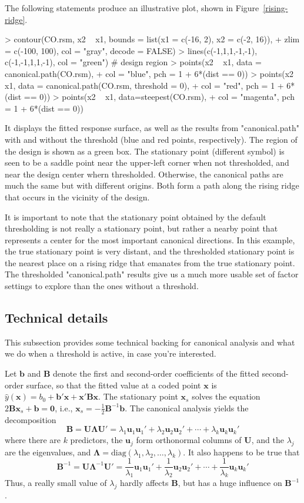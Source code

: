\documentclass[article,nojss]{jss}
\def\bb{\mathbf{b}}
\def\bB{\mathbf{B}}
\def\bu{\mathbf{u}}
\def\bU{\mathbf{U}}
\def\bLambda{\pmb{\Lambda}}
\def\bx{\mathbf{x}}
\def\bzero{\mathbf{0}}
\def\yhat{\hat{y}}
\begin{document}
The following statements produce an illustrative plot, shown in Figure~\ref{rising-ridge}.
\begin{Schunk}
\begin{Sinput}
> contour(CO.rsm, x2 ~ x1, bounds = list(x1 = c(-16, 2), x2 = c(-2, 16)), 
+         zlim = c(-100, 100), col = "gray", decode = FALSE)
> lines(c(-1,1,1,-1,-1), c(-1,-1,1,1,-1), col = "green") # design region
> points(x2 ~ x1, data = canonical.path(CO.rsm), 
+         col = "blue", pch = 1 + 6*(dist == 0))
> points(x2 ~ x1, data = canonical.path(CO.rsm, threshold = 0), 
+         col = "red", pch = 1 + 6*(dist == 0))
> points(x2 ~ x1, data=steepest(CO.rsm), 
+         col = "magenta", pch = 1 + 6*(dist == 0))
\end{Sinput}
\end{Schunk}
It displays the fitted response surface, as well as the results from "canonical.path" with and without the threshold (blue and red points, respectively). The region of the design is shown as a green box. The stationary point (different symbol) is seen to be a saddle point near the upper-left corner when not thresholded, and near the design center whern thresholded. Otherwise, the canonical paths are much the same but with different origins. Both form a path along the rising ridge that occurs in the vicinity of the design. 

It is important to note that the stationary point obtained by the default thresholding is not really a stationary point, but rather a nearby point that represents a center for the most important canonical directions. In this example, the true stationary point is very distant, and the thresholded stationary point is the nearest place on a rising ridge that emanates from the true stationary point. The thresholded "canonical.path" results give us a much more usable set of factor settings to explore than the ones without a threshold.

\subsection{Technical details}
This subsection provides some technical backing for canonical analysis
and what we do when a threshold is active, in case you're interested. 

Let $\bb$ and $\bB$ denote the first and second-order coefficients of the fitted second-order surface, so that the fitted value at a coded point $\bx$ is $\yhat(\bx) = b_0 + \bb'\bx + \bx'\bB\bx$. The stationary point $\bx_s$ solves the equation $2\bB\bx_s + \bb = \bzero$, i.e., $\bx_s = -\frac12\bB^{-1}\bb$. The canonical analysis yields the decomposition 
\[ \bB = \bU\bLambda\bU' = \lambda_1\bu_1\bu_1' + \lambda_2\bu_2\bu_2' + \cdots + \lambda_k\bu_k\bu_k' \]
where there are $k$ predictors, the $\bu_j$ form orthonormal columns of $\bU$, and the $\lambda_j$ are the eigenvalues, and $\bLambda = \mathrm{diag}(\lambda_1,\lambda_2,\ldots,\lambda_k)$. It also happens to be true that 
\[ \bB^{-1} = \bU\bLambda^{-1}\bU'
= \textstyle\frac1{\lambda_1}\bu_1\bu_1' + \frac1{\lambda_2}\bu_2\bu_2' + \cdots + \frac1{\lambda_k}\bu_k\bu_k'  \]
Thus, a really small value of $\lambda_j$ hardly affects $\bB$, but has a huge influence on $\bB^{-1}$.
\end{document}

